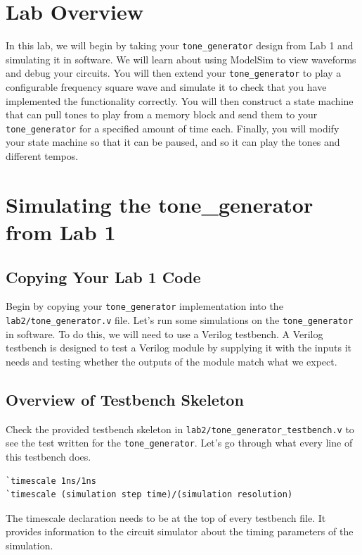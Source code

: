 \documentclass[11pt]{article}
\begin{document}
\section{Lab Overview}

In this lab, we will begin by taking your \verb|tone_generator| design from Lab 1 and simulating it in software. We will learn about using ModelSim to view waveforms and debug your circuits. You will then extend your \verb|tone_generator| to play a configurable frequency square wave and simulate it to check that you have implemented the functionality correctly. You will then construct a state machine that can pull tones to play from a memory block and send them to your \verb|tone_generator| for a specified amount of time each. Finally, you will modify your state machine so that it can be paused, and so it can play the tones and different tempos.

\section{Simulating the tone\_generator from Lab 1}

\subsection{Copying Your Lab 1 Code}

Begin by copying your \verb|tone_generator| implementation into the \verb|lab2/tone_generator.v| file. Let's run some simulations on the \verb|tone_generator| in software. To do this, we will need to use a Verilog testbench. A Verilog testbench is designed to test a Verilog module by supplying it with the inputs it needs and testing whether the outputs of the module match what we expect.


\subsection{Overview of Testbench Skeleton}
Check the provided testbench skeleton in \verb|lab2/tone_generator_testbench.v| to see the test written for the \verb|tone_generator|. Let's go through what every line of this testbench does.

\begin{verbatim}
`timescale 1ns/1ns
`timescale (simulation step time)/(simulation resolution)
\end{verbatim}

The timescale declaration needs to be at the top of every testbench file. It provides information to the circuit simulator about the timing parameters of the simulation.
\end{document}
